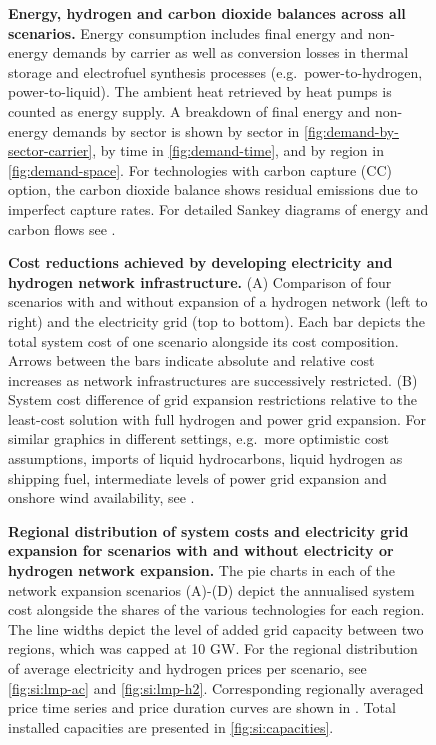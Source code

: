 
\begin{figure}[!ht]
    \caption{ \textbf{Energy, hydrogen and carbon dioxide balances across all
    scenarios.} Energy consumption includes final energy and non-energy demands
    by carrier as well as conversion losses in thermal storage and electrofuel
    synthesis processes (e.g.~power-to-hydrogen, power-to-liquid). The ambient
    heat retrieved by heat pumps is counted as energy supply. A breakdown of
    final energy and non-energy demands by sector is shown by sector in
    \cref{fig:demand-by-sector-carrier}, by time in \cref{fig:demand-time}, and
    by region in \cref{fig:demand-space}. For technologies with carbon capture
    (CC) option, the carbon dioxide balance shows residual emissions due to
    imperfect capture rates. For detailed Sankey diagrams of energy and carbon
    flows see .}
    \label{fig:balance}
\end{figure}


\begin{figure}
    \caption{ \textbf{Cost reductions achieved by developing electricity and
    hydrogen network infrastructure.} (A) Comparison of four scenarios with and
    without expansion of a hydrogen network (left to right) and the electricity
    grid (top to bottom). Each bar depicts the total system cost of one scenario
    alongside its cost composition. Arrows between the bars indicate absolute
    and relative cost increases as network infrastructures are successively
    restricted. (B) System cost difference of grid expansion restrictions
    relative to the least-cost solution with full hydrogen and power grid
    expansion. For similar graphics in different settings, e.g.~more optimistic
    cost assumptions, imports of liquid hydrocarbons, liquid hydrogen as
    shipping fuel, intermediate levels of power grid expansion and onshore wind
    availability, see
    . }
    \label{fig:sensitivity-h2}
\end{figure}


\begin{figure}
    \caption{ \textbf{Regional distribution of system costs and electricity grid
    expansion for scenarios with and without electricity or hydrogen network
    expansion.} The pie charts in each of the network expansion scenarios
    (A)-(D) depict the annualised system cost alongside the shares of the
    various technologies for each region. The line widths depict the level of
    added grid capacity between two regions, which was capped at 10 GW. For the
    regional distribution of average electricity and hydrogen prices per
    scenario, see \cref{fig:si:lmp-ac} and \cref{fig:si:lmp-h2}. Corresponding
    regionally averaged price time series and price duration curves are shown in
    . Total installed capacities are
    presented in \cref{fig:si:capacities}.}
    \label{fig:tsc}
\end{figure}

